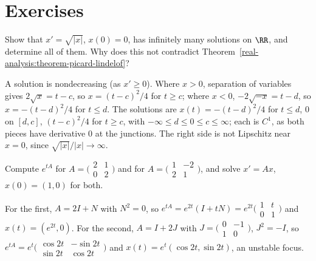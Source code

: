 \section{Exercises}\label{ordinary-differential-equations:section-exercises}

\begin{exercise}\label{ordinary-differential-equations:exercise-square-root}
Show that $x' = \sqrt{|x|}$, $x(0) = 0$, has infinitely many solutions on $\RR$, and determine all of them. Why does this not contradict Theorem~\ref{real-analysis:theorem-picard-lindelof}?
\end{exercise}

\begin{solution}
A solution is nondecreasing (as $x' \geq 0$). Where $x > 0$, separation of variables gives $2\sqrt x = t - c$, so $x = (t - c)^2/4$ for $t \geq c$; where $x < 0$, $-2\sqrt{-x} = t - d$, so $x = -(t - d)^2/4$ for $t \leq d$. The solutions are
$x(t) = -(t - d)^2/4$ for $t \leq d$, $0$ on $[d, c]$, $(t - c)^2/4$ for $t \geq c$, with $-\infty \leq d \leq 0 \leq c \leq \infty$; each is $C^1$, as both pieces have derivative $0$ at the junctions. The right side is not Lipschitz near $x = 0$, since
$\sqrt{|x|}/|x| \to \infty$.
\end{solution}

\begin{exercise}\label{ordinary-differential-equations:exercise-exponential-jordan}
Compute $e^{tA}$ for $A = \bigl(\begin{smallmatrix}2 & 1\\ 0 & 2\end{smallmatrix}\bigr)$ and for $A = \bigl(\begin{smallmatrix}1 & -2\\ 2 & 1\end{smallmatrix}\bigr)$, and solve $x' = Ax$, $x(0) = (1, 0)$ for both.
\end{exercise}

\begin{solution}
For the first, $A = 2I + N$ with $N^2 = 0$, so $e^{tA} = e^{2t}(I + tN) = e^{2t}\bigl(\begin{smallmatrix}1 & t\\ 0 & 1\end{smallmatrix}\bigr)$ and $x(t) = (e^{2t}, 0)$. For the second, $A = I + 2J$ with $J = \bigl(\begin{smallmatrix}0 & -1\\ 1 & 0\end{smallmatrix}\bigr)$,
$J^2 = -I$, so $e^{tA} = e^t\bigl(\begin{smallmatrix}\cos 2t & -\sin 2t\\ \sin 2t & \cos 2t\end{smallmatrix}\bigr)$ and $x(t) = e^t(\cos 2t, \sin 2t)$, an unstable focus.
\end{solution}

